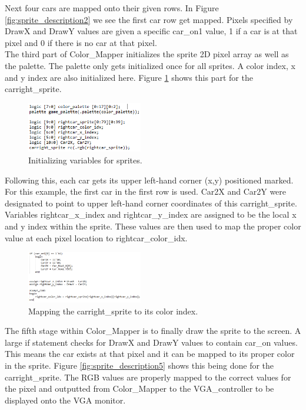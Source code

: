 \documentclass[journal, twocolumn, final,11pt,letterpaper]{IEEEtran}
\begin{document}
Next four cars are mapped onto their given rows.  In Figure \ref{fig:sprite_description2} we see the first car row get mapped.  Pixels specified by DrawX and DrawY values are given a specific car\_on1 value, 1 if a car is at that pixel and 0 if there is no car at that pixel.  \\

The third part of Color\_Mapper initializes the sprite 2D pixel array as well as the palette.  The palette only gets initialized once for all sprites.  A color index, x and y index are also initialized here.  Figure \ref{fig:sprite_description3} shows this part for the carright\_sprite.            

 	\begin{figure}[H]
 		\centering
 		\includegraphics[width=0.45\textwidth]{sprite_description3.png}
 		\caption{Initializing variables for sprites.}
 		\label{fig:sprite_description3}
 	\end{figure} 

Following this, each car gets its upper left-hand corner (x,y) positioned marked.  For this example, the first car in the first row is used.  Car2X and Car2Y were designated to point to upper left-hand corner coordinates of this carright\_sprite. Variables rightcar\_x\_index and rightcar\_y\_index are assigned to be the local x and y index within the sprite.  These values are then used to map the proper color value at each pixel location to rightcar\_color\_idx.   
	
 	\begin{figure}[H]
 		\centering
 		\includegraphics[width=0.45\textwidth]{sprite_description4.png}
 		\caption{Mapping the carright\_sprite to its color index.}
 		\label{fig:sprite_description4}
 	\end{figure}	
	
The fifth stage within Color\_Mapper is to finally draw the sprite to the screen.  A large if statement checks for DrawX and DrawY values to contain car\_on values.  This means the car exists at that pixel and it can be mapped to its proper color in the sprite.  Figure \ref{fig:sprite_description5} shows this being done for the carright\_sprite.  The RGB values are properly mapped to the correct values for the pixel and outputted from Color\_Mapper to the VGA\_controller to be displayed onto the VGA monitor. 
\end{document}
